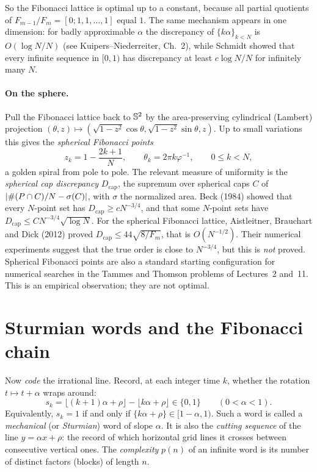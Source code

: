 So the Fibonacci lattice is optimal up to a constant, because all partial quotients of
$F_{m-1}/F_m=[0;1,1,\dots,1]$ equal $1$. The same mechanism appears in one dimension: for badly
approximable $\alpha$ the discrepancy of $\{k\alpha\}_{k<N}$ is $O(\log N/N)$ (see Kuipers--Niederreiter,
Ch.~2), while Schmidt showed that every infinite sequence in $[0,1)$ has discrepancy at least $c\log N/N$ for infinitely many $N$.

\paragraph{On the sphere.} Pull the Fibonacci lattice back to $\mathbb{S}^2$ by the area-preserving
cylindrical (Lambert) projection $(\theta,z)\mapsto(\sqrt{1-z^2}\cos\theta,\sqrt{1-z^2}\sin\theta,z)$.
Up to small variations this gives the \emph{spherical Fibonacci points}
\begin{equation}\label{ERG:eq:sphfib}
  z_k=1-\frac{2k+1}{N},\qquad \theta_k=2\pi k\varphi^{-1},\qquad 0\le k<N,
\end{equation}
a golden spiral from pole to pole. The relevant measure of uniformity is the \emph{spherical cap
discrepancy} $D_{\mathrm{cap}}$, the supremum over spherical caps $C$ of $\left\lvert \#(P\cap C)/N-\sigma(C) \right\rvert$,
with $\sigma$ the normalized area. Beck (1984) showed that every $N$-point set has
$D_{\mathrm{cap}}\ge cN^{-3/4}$, and that some $N$-point sets have $D_{\mathrm{cap}}\le C N^{-3/4}\sqrt{\log N}$.
For the spherical Fibonacci lattice, Aistleitner, Brauchart and Dick (2012) proved
$D_{\mathrm{cap}}\le 44\sqrt{8/F_m}$, that is $O(N^{-1/2})$. Their numerical experiments suggest
that the true order is close to $N^{-3/4}$, but this is \emph{not} proved. Spherical Fibonacci points
are also a standard starting configuration for numerical searches in the Tammes and Thomson problems
of Lectures~2 and~11. This is an empirical observation; they are not optimal.

\section{Sturmian words and the Fibonacci chain}
\label{ERG:sec:sturm}

Now \emph{code} the irrational line. Record, at each integer time $k$, whether the rotation
$t\mapsto t+\alpha$ wraps around:
\[
  s_k=\lfloor(k+1)\alpha+\rho\rfloor-\lfloor k\alpha+\rho\rfloor\in\{0,1\}\qquad(0<\alpha<1).
\]
Equivalently, $s_k=1$ if and only if $\{k\alpha+\rho\}\in[1-\alpha,1)$. Such a word is called a
\emph{mechanical} (or \emph{Sturmian}) word of slope $\alpha$. It is also the \emph{cutting sequence} of
the line $y=\alpha x+\rho$: the record of which horizontal grid lines it crosses between consecutive
vertical ones. The \emph{complexity} $p(n)$ of an infinite word is its number of distinct factors (blocks)
of length $n$.


